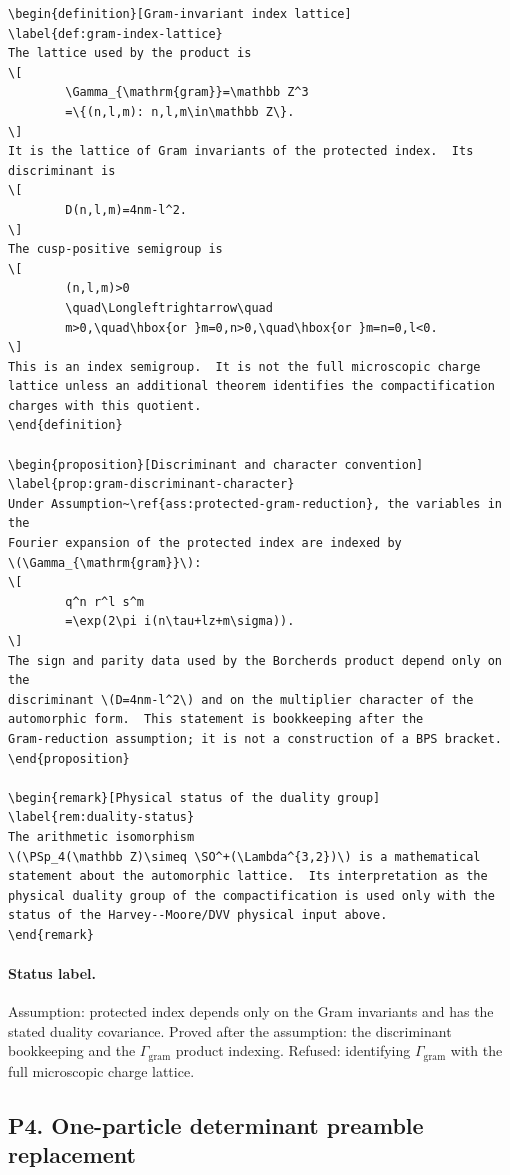 \begin{verbatim}
\begin{definition}[Gram-invariant index lattice]
\label{def:gram-index-lattice}
The lattice used by the product is
\[
        \Gamma_{\mathrm{gram}}=\mathbb Z^3
        =\{(n,l,m): n,l,m\in\mathbb Z\}.
\]
It is the lattice of Gram invariants of the protected index.  Its
discriminant is
\[
        D(n,l,m)=4nm-l^2.
\]
The cusp-positive semigroup is
\[
        (n,l,m)>0
        \quad\Longleftrightarrow\quad
        m>0,\quad\hbox{or }m=0,n>0,\quad\hbox{or }m=n=0,l<0.
\]
This is an index semigroup.  It is not the full microscopic charge
lattice unless an additional theorem identifies the compactification
charges with this quotient.
\end{definition}

\begin{proposition}[Discriminant and character convention]
\label{prop:gram-discriminant-character}
Under Assumption~\ref{ass:protected-gram-reduction}, the variables in the
Fourier expansion of the protected index are indexed by
\(\Gamma_{\mathrm{gram}}\):
\[
        q^n r^l s^m
        =\exp(2\pi i(n\tau+lz+m\sigma)).
\]
The sign and parity data used by the Borcherds product depend only on the
discriminant \(D=4nm-l^2\) and on the multiplier character of the
automorphic form.  This statement is bookkeeping after the
Gram-reduction assumption; it is not a construction of a BPS bracket.
\end{proposition}

\begin{remark}[Physical status of the duality group]
\label{rem:duality-status}
The arithmetic isomorphism
\(\PSp_4(\mathbb Z)\simeq \SO^+(\Lambda^{3,2})\) is a mathematical
statement about the automorphic lattice.  Its interpretation as the
physical duality group of the compactification is used only with the
status of the Harvey--Moore/DVV physical input above.
\end{remark}
\end{verbatim}

\paragraph{Status label.}
Assumption: protected index depends only on the Gram invariants and has
the stated duality covariance.  Proved after the assumption: the
discriminant bookkeeping and the \(\Gamma_{\mathrm{gram}}\) product
indexing.  Refused: identifying \(\Gamma_{\mathrm{gram}}\) with the full
microscopic charge lattice.

\subsection{P4. One-particle determinant preamble replacement}

